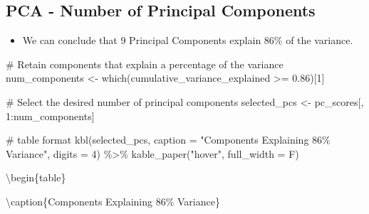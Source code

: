 \documentclass[
  letterpaper,
  DIV=11,
  numbers=noendperiod]{scrreprt}
\newenvironment{Shaded}{\begin{snugshade}}{\end{snugshade}}
\newcommand{\AttributeTok}[1]{\textcolor[rgb]{0.40,0.45,0.13}{#1}}
\newcommand{\CommentTok}[1]{\textcolor[rgb]{0.37,0.37,0.37}{#1}}
\newcommand{\DecValTok}[1]{\textcolor[rgb]{0.68,0.00,0.00}{#1}}
\newcommand{\FloatTok}[1]{\textcolor[rgb]{0.68,0.00,0.00}{#1}}
\newcommand{\FunctionTok}[1]{\textcolor[rgb]{0.28,0.35,0.67}{#1}}
\newcommand{\NormalTok}[1]{\textcolor[rgb]{0.00,0.23,0.31}{#1}}
\newcommand{\OtherTok}[1]{\textcolor[rgb]{0.00,0.23,0.31}{#1}}
\newcommand{\SpecialCharTok}[1]{\textcolor[rgb]{0.37,0.37,0.37}{#1}}
\newcommand{\StringTok}[1]{\textcolor[rgb]{0.13,0.47,0.30}{#1}}
\providecommand{\tightlist}{%
  \setlength{\itemsep}{0pt}\setlength{\parskip}{0pt}}\usepackage{longtable,booktabs,array}
\begin{document}
\hypertarget{pca---number-of-principal-components}{%
\subsection{PCA - Number of Principal
Components}\label{pca---number-of-principal-components}}

\begin{itemize}
\tightlist
\item
  We can conclude that 9 Principal Components explain 86\% of the
  variance.
\end{itemize}

\begin{Shaded}
\begin{Highlighting}[]
\CommentTok{\# Retain components that explain a percentage of the variance}
\NormalTok{num\_components }\OtherTok{\textless{}{-}} \FunctionTok{which}\NormalTok{(cumulative\_variance\_explained }\SpecialCharTok{\textgreater{}=} \FloatTok{0.86}\NormalTok{)[}\DecValTok{1}\NormalTok{]}

\CommentTok{\# Select the desired number of principal components}
\NormalTok{selected\_pcs }\OtherTok{\textless{}{-}}\NormalTok{ pc\_scores[, }\DecValTok{1}\SpecialCharTok{:}\NormalTok{num\_components]}

\CommentTok{\# table format}
\FunctionTok{kbl}\NormalTok{(selected\_pcs, }\AttributeTok{caption =} \StringTok{"Components Explaining 86\% Variance"}\NormalTok{,}
    \AttributeTok{digits =} \DecValTok{4}\NormalTok{) }\SpecialCharTok{\%\textgreater{}\%}
  \FunctionTok{kable\_paper}\NormalTok{(}\StringTok{"hover"}\NormalTok{, }\AttributeTok{full\_width =}\NormalTok{ F)}
\end{Highlighting}
\end{Shaded}

\textbackslash begin\{table\}

\textbackslash caption\{\label{tab:unnamed-chunk-20}Components
Explaining 86\% Variance\} \centering
\end{document}
